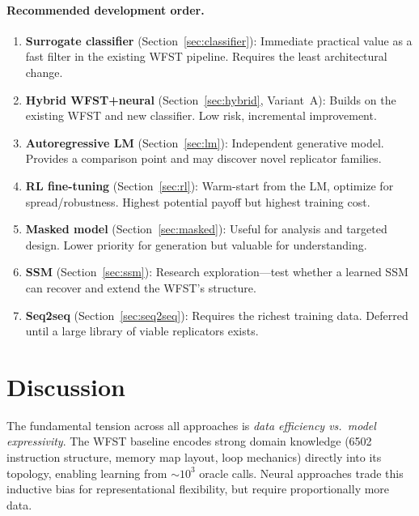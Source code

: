 \documentclass{article}
\begin{document}
\paragraph{Recommended development order.}
\begin{enumerate}
  \item \textbf{Surrogate classifier} (Section~\ref{sec:classifier}):
        Immediate practical value as a fast filter in the existing WFST
        pipeline.  Requires the least architectural change.
  \item \textbf{Hybrid WFST+neural} (Section~\ref{sec:hybrid}, Variant~A):
        Builds on the existing WFST and new classifier.  Low risk,
        incremental improvement.
  \item \textbf{Autoregressive LM} (Section~\ref{sec:lm}):
        Independent generative model.  Provides a comparison point and
        may discover novel replicator families.
  \item \textbf{RL fine-tuning} (Section~\ref{sec:rl}):
        Warm-start from the LM, optimize for spread/robustness.
        Highest potential payoff but highest training cost.
  \item \textbf{Masked model} (Section~\ref{sec:masked}):
        Useful for analysis and targeted design.  Lower priority for
        generation but valuable for understanding.
  \item \textbf{SSM} (Section~\ref{sec:ssm}):
        Research exploration---test whether a learned SSM can recover
        and extend the WFST's structure.
  \item \textbf{Seq2seq} (Section~\ref{sec:seq2seq}):
        Requires the richest training data.  Deferred until a large
        library of viable replicators exists.
\end{enumerate}


\section{Discussion}
\label{sec:discussion}

The fundamental tension across all approaches is \emph{data efficiency
vs.\ model expressivity}.  The WFST baseline encodes strong domain
knowledge (6502 instruction structure, memory map layout, loop mechanics)
directly into its topology, enabling learning from ${\sim}10^3$ oracle
calls.  Neural approaches trade this inductive bias for representational
flexibility, but require proportionally more data.
\end{document}
